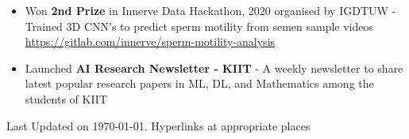 \documentclass[11pt,a4paper,calibri]{moderncv}        %
\begin{document}
	\begin{itemize}
		\item Won \textbf{2nd Prize} in Innerve Data Hackathon, 2020 organised by IGDTUW - Trained 3D CNN's to predict sperm motility from semen sample videos \url{https://gitlab.com/innerve/sperm-motility-analysis}
		
		\item Launched \textbf{AI Research Newsletter - KIIT} - A weekly newsletter to share latest popular research papers in ML, DL, and Mathematics among the students of KIIT
	\end{itemize}
	
	
%	
	
	
	\vfill
	\textnormal{\footnotesize Last Updated on \today. Hyperlinks at appropriate places}
	
%	
	
	
	
\end{document}
